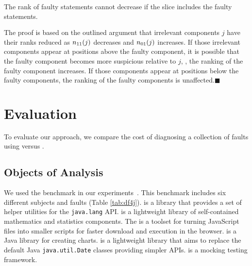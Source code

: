 \documentclass{article}
\begin{document}
\begin{theorem}
  The rank of faulty statements cannot decrease if the slice includes
  the faulty statements.
\end{theorem}

The proof is based on the outlined argument that irrelevant
components $j$ have their ranks reduced as $n_{11}(j)$ decreases and
$n_{01}(j)$ increases. If those irrelevant components appear at positions
above the faulty component, it is possible that the faulty component
becomes more suspicious relative to $j$, \ie{}, the ranking of the
faulty component increases. If those components appear at positions
below the faulty components, the ranking of the faulty components is
unaffected.\hfill{\tiny$\blacksquare$}

%
\section{Evaluation}
\label{sec:eval}
%
To evaluate our approach, we compare the cost of diagnosing
a collection of faults using \sfl{} versus \comb{}.
%
\subsection{Objects of Analysis}\label{sec:analysis}

We used the \dfj{} benchmark in our experiments~\cite{just-defects4j-issta2014}.
This benchmark includes six different subjects and \numFaults{} faults (Table
\ref{tab:df4j}). \lang{} is a library that provides a set of helper utilities
for the {\small\texttt{java.lang}} API. \cmath{} is a lightweight library of
self-contained mathematics and statistics components. The \closure{} is a
toolset for turning JavaScript files into smaller scripts for faster download
and execution in the browser. \chart{} is a Java library for creating charts.
\jtime{} is a lightweight library that aims to replace the default Java
{\small\texttt{java.util.Date}} classes providing simpler APIs. \mockito{} is a
mocking testing framework.
\end{document}
